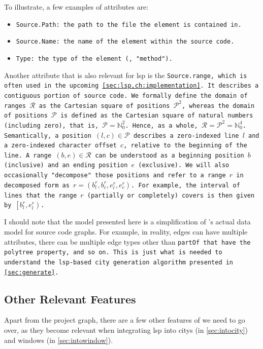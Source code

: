 \documentclass[../thesis]{subfiles}
\begin{document}
To illustrate, a few examples of attributes are:
\begin{itemize}
	\item \tt{Source.Path}: the path to the file the element is contained in.
	\item \tt{Source.Name}: the name of the element within the source code.
	\item \tt{Type}: the type of the element (\eg{}, "method").
\end{itemize}

Another attribute that is also relevant for \gls{lsp} is the \tt{Source.\allowbreak\Gls*{range}}, which is often used in the upcoming \cref{sec:lsp,ch:implementation}.
It describes a contiguous portion of source code.
We formally define the domain of ranges $\mathcal{R}$ as the Cartesian square of positions $\mathcal{P}^2$, whereas the domain of positions $\mathcal{P}$ is defined as the Cartesian square of natural numbers (including zero), that is, $\mathcal{P} = \mathbb{N}^2_0$.
Hence, as a whole, $\mathcal{R} = \mathcal{P}^2 = \mathbb{N}^4_0$.
Semantically, a position $(l, c) \in \mathcal{P}$ describes a zero-indexed line $l$ and a zero-indexed character offset $c$, relative to the beginning of the line.
A range $(b, e) \in \mathcal{R}$ can be understood as a beginning position $b$ (inclusive) and an ending position $e$ (exclusive).
We will also occasionally "decompose" those positions and refer to a range $r$ in decomposed form as $r = \left(b_l^r, b_c^r, e_l^r, e_c^r\right)$.
For example, the interval of lines that the range $r$ (partially or completely) covers is then given by $\left[b_l^r, e_l^r\right)$.

I should note that the model presented here is a simplification of \SEE{}'s actual data model for source code graphs.
For example, in reality, edges can have multiple attributes, there can be multiple edge types other than \tt{partOf} that have the \gls{polytree} property, and so on.
This is just what is needed to understand the \gls{lsp}-based city generation algorithm presented in \cref{sec:generate}.

\subsection{Other Relevant Features}\label{subsec:seeother}

Apart from the project graph, there are a few other features of \SEE{} we need to go over, as they become relevant when integrating \gls{lsp} into \glspl{city} (in \cref{sec:intocity}) and \glspl{window} (in \cref{sec:intowindow}).
\end{document}
